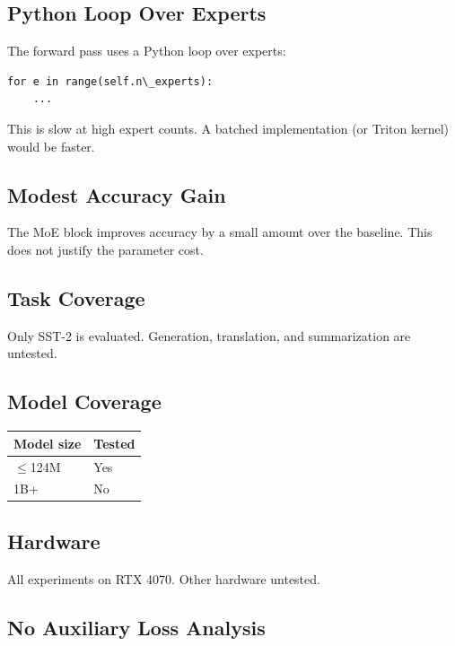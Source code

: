 \subsection{Python Loop Over Experts}

The forward pass uses a Python loop over experts:

\begin{lstlisting}
for e in range(self.n\_experts):
    ...
\end{lstlisting}

This is slow at high expert counts. A batched implementation (or Triton 
kernel) would be faster.

\subsection{Modest Accuracy Gain}

The MoE block improves accuracy by a small amount over the baseline. This 
does not justify the parameter cost.

\subsection{Task Coverage}

Only SST-2 is evaluated. Generation, translation, and summarization are 
untested.

\subsection{Model Coverage}

\begin{table}[H]
\centering
\small
\begin{tabular}{ll}
\toprule
\textbf{Model size} & \textbf{Tested} \\
\midrule
$\le$124M & Yes \\
1B+ & No \\
\bottomrule
\end{tabular}
\end{table}

\subsection{Hardware}

All experiments on RTX 4070. Other hardware untested.

\subsection{No Auxiliary Loss Analysis}

